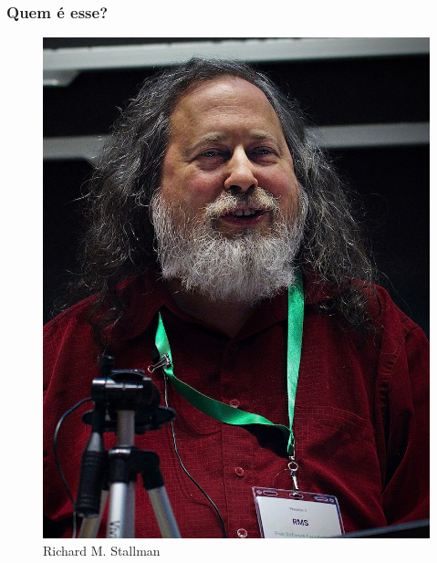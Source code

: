 \documentclass[xcolor=dvipsnames]{beamer}
\begin{document}
 \begin{frame}
 	\frametitle{Quem é esse?}
 	\begin{figure}
 	\begin{center}
 	\includegraphics[scale=0.9]{rms.jpg}\\
 	Richard M. Stallman
     
 	\end{center}
 	\end{figure}
 \end{frame}
\end{document}
